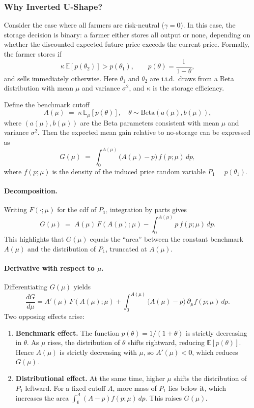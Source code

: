 \subsubsection{Why Inverted U-Shape?}
\noindent
Consider the case where all farmers are risk-neutral ($\gamma=0$). In this case, the storage decision is binary: a farmer either stores all output or none, depending on whether the discounted expected future price exceeds the current price. Formally, the farmer stores if
\[
\kappa\,\mathbb{E}[p(\theta_2)] > p(\theta_1), \qquad p(\theta)=\frac{1}{1+\theta},
\]
and sells immediately otherwise. Here $\theta_1$ and $\theta_2$ are i.i.d.\ draws from a Beta distribution with mean $\mu$ and variance $\sigma^2$, and $\kappa$ is the storage efficiency.

Define the benchmark cutoff
\[
A(\mu) \;=\; \kappa\,\mathbb{E}_{\mu}[p(\theta)], \quad \theta\sim\text{Beta}(a(\mu),b(\mu)),
\]
where $(a(\mu),b(\mu))$ are the Beta parameters consistent with mean $\mu$ and variance $\sigma^2$. Then the expected mean gain relative to no-storage can be expressed as
\[
G(\mu) \;=\; \int_{0}^{A(\mu)} \big(A(\mu)-p\big)\,f(p;\mu)\,dp,
\]
where $f(p;\mu)$ is the density of the induced price random variable $P_1=p(\theta_1)$.

\paragraph{Decomposition.}  
Writing $F(\cdot;\mu)$ for the cdf of $P_1$, integration by parts gives
\[
G(\mu) \;=\; A(\mu)\,F(A(\mu);\mu) - \int_{0}^{A(\mu)} p\,f(p;\mu)\,dp.
\]
This highlights that $G(\mu)$ equals the ``area'' between the constant benchmark $A(\mu)$ and the distribution of $P_1$, truncated at $A(\mu)$.

\paragraph{Derivative with respect to $\mu$.}  
Differentiating $G(\mu)$ yields
\[
\frac{dG}{d\mu}
= A'(\mu)\,F(A(\mu);\mu)
+ \int_{0}^{A(\mu)} \big(A(\mu)-p\big)\,\partial_{\mu} f(p;\mu)\,dp.
\]
Two opposing effects arise:
\begin{enumerate}
    \item \textbf{Benchmark effect.} The function $p(\theta)=1/(1+\theta)$ is strictly decreasing in $\theta$. As $\mu$ rises, the distribution of $\theta$ shifts rightward, reducing $\mathbb{E}[p(\theta)]$. Hence $A(\mu)$ is strictly decreasing with $\mu$, so $A'(\mu)<0$, which reduces $G(\mu)$.
    \item \textbf{Distributional effect.} At the same time, higher $\mu$ shifts the distribution of $P_1$ leftward. For a fixed cutoff $A$, more mass of $P_1$ lies below it, which increases the area $\int_{0}^{A}(A-p)f(p;\mu)\,dp$. This raises $G(\mu)$.
\end{enumerate}

